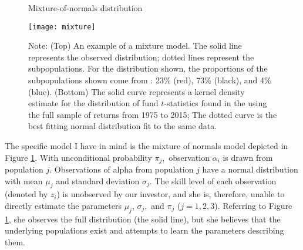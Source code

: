 
\begin{figure}[ht!]
\small
\centering
\captionsetup{labelsep=colon, font=footnotesize, justification=centerfirst, width=\linewidth}
\caption{Mixture-of-normals distribution}
\label{fig:mixture}
\centering
\texttt{[image: mixture]}
\captionsetup{font=footnotesize, justification=justified, width=\textwidth}
\caption*{Note: (Top) An example of a mixture model. The solid line represents the observed distribution; dotted lines represent the subpopulations. For the distribution shown, the proportions of the subpopulations shown come from \citet{Barras2010}: 23\% (red), 73\% (black), and 4\% (blue). (Bottom) The solid curve represents a kernel density estimate for the distribution of fund $t$-statistics found in the using the full sample of returns from 1975 to 2015; The dotted curve is the best fitting normal distribution fit to the same data.}
\end{figure}

The specific model I have in mind is the mixture of normals model depicted in Figure \ref{fig:mixture}. With unconditional probability $\pi_j,$ observation $\alpha_i$ is drawn from population $j$. Observations of alpha from population $j$ have a normal distribution with mean $\mu_j$ and standard deviation $\sigma_j$.  The skill level of each observation (denoted by $z_i$) is unobserved by our investor, and she is, therefore, unable to directly estimate the parameters $\mu_j$, $\sigma_j,$ and $\pi_j$ ($j=1,2,3$).  Referring to Figure \ref{fig:mixture}, she observes the full distribution (the solid line), but she believes that the underlying populations exist and attempts to learn the parameters describing them.

